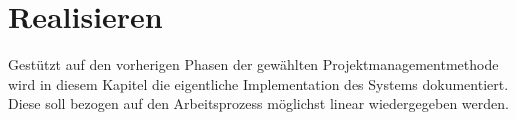 \chapter{Realisieren} \label{ch:implement}

Gestützt auf den vorherigen Phasen der gewählten Projektmanagementmethode wird in diesem Kapitel die eigentliche Implementation des Systems dokumentiert.
Diese soll bezogen auf den Arbeitsprozess möglichst linear wiedergegeben werden.



